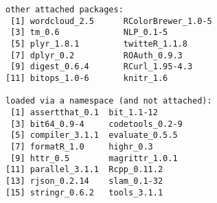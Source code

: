 \documentclass[9pt,english]{extarticle}\usepackage[]{graphicx}\usepackage[]{color}
\makeatletter
\newenvironment{kframe}{%
 \def\at@end@of@kframe{}%
 \ifinner\ifhmode%
  \def\at@end@of@kframe{\end{minipage}}%
  \begin{minipage}{\columnwidth}%
 \fi\fi%
 \def\FrameCommand##1{\hskip\@totalleftmargin \hskip-\fboxsep
 \colorbox{shadecolor}{##1}\hskip-\fboxsep
     \hskip-\linewidth \hskip-\@totalleftmargin \hskip\columnwidth}%
 \MakeFramed {\advance\hsize-\width
   \@totalleftmargin\z@ \linewidth\hsize
   \@setminipage}}%
 {\par\unskip\endMakeFramed%
 \at@end@of@kframe}
\newenvironment{knitrout}{}{} %
\makeatother
\begin{document}
\begin{linenumbers}
\begin{knitrout}
\begin{kframe}
\begin{verbatim}
other attached packages:
 [1] wordcloud_2.5      RColorBrewer_1.0-5
 [3] tm_0.6             NLP_0.1-5         
 [5] plyr_1.8.1         twitteR_1.1.8     
 [7] dplyr_0.2          ROAuth_0.9.3      
 [9] digest_0.6.4       RCurl_1.95-4.3    
[11] bitops_1.0-6       knitr_1.6         

loaded via a namespace (and not attached):
 [1] assertthat_0.1  bit_1.1-12     
 [3] bit64_0.9-4     codetools_0.2-9
 [5] compiler_3.1.1  evaluate_0.5.5 
 [7] formatR_1.0     highr_0.3      
 [9] httr_0.5        magrittr_1.0.1 
[11] parallel_3.1.1  Rcpp_0.11.2    
[13] rjson_0.2.14    slam_0.1-32    
[15] stringr_0.6.2   tools_3.1.1    
\end{verbatim}
\end{kframe}
\end{knitrout}


\end{linenumbers}
\end{document}

